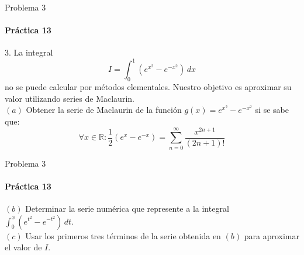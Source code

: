 \documentclass{plantillaPPT}
\begin{document}
\begin{frame}{Problema 3}
    \framesubtitle{Práctica 13}
    3. La integral
    \begin{equation*}
        I = \int_0^1 (e^{x^2} - e^{-x^2})\,dx
    \end{equation*}
    no se puede calcular por métodos elementales. Nuestro objetivo es aproximar su valor utilizando series de Maclaurin.\\[10pt]
    $(a)$ Obtener la serie de Maclaurin de la función $g(x) = e^{x^2}-e^{-x^2}$ si se sabe que:
    \begin{equation*}
        \forall x\in\mathbb{R}: \frac{1}{2}(e^x-e^{-x}) = \sum_{n=0}^\infty \frac{x^{2n+1}}{(2n+1)!}
    \end{equation*}
    
\end{frame}
\begin{frame}{Problema 3}
    \framesubtitle{Práctica 13}
    $(b)$ Determinar la serie numérica que represente a la integral \\[5pt] $\displaystyle \int_0^x (e^{t^2}-e^{-t^2})\,dt$.\\[5pt]
    $(c)$ Usar los primeros tres términos de la serie obtenida en $(b)$ para aproximar el valor de $I$.
\end{frame}
\end{document}
